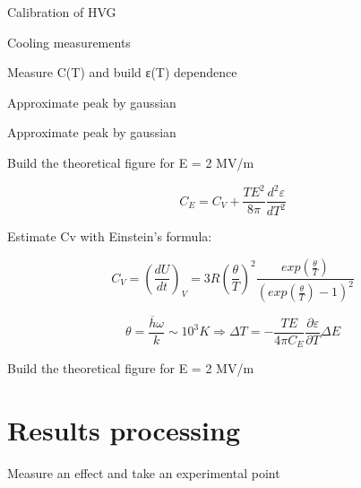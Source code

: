 \documentclass [xcolor=svgnames, t] {beamer}
\begin{document}
\begin{frame}{Calibration of HVG
}
\end{frame}
\begin{frame}{Cooling measurements
}
\end{frame}
\begin{frame}{Measure C(T) and build ε(T) dependence
}
\end{frame}
\begin{frame}{Approximate peak by gaussian
}
\end{frame}
\begin{frame}{Approximate peak by gaussian
}
\end{frame}

\begin{frame}{Build the theoretical figure for E = 2 MV/m
}
\begin{block}{}
 \begin{equation}
     C_{E} = C_{V}+\frac{TE^{2}}{8\pi} \frac{d^{2}\varepsilon }{d T^{2}}
 \end{equation}  
 \end{block}
 Estimate Cv with Einstein’s formula:
 \begin{block}{}
\begin{equation}
   C_{V}=\left(\frac{dU}{dt}\right)_{V} = 3R\left(\frac{\theta}{T}\right)^{2} \frac{exp\left(\frac{\theta}{T}\right)}{\left(exp\left(\frac{\theta}{T}\right)-1\right)^{2}}
\end{equation}
\end{block}
\begin{block}{}
\begin{equation}
    \theta = \frac{\overline{h}\omega}{k}\sim 10^{3} K \Rightarrow \Delta T = -\frac{TE}{4\pi C_E} \frac{\partial \varepsilon}{\partial T} \Delta E
\end{equation}
\end{block}
\end{frame}
\begin{frame}{Build the theoretical figure for E = 2 MV/m
}
\end{frame}
\section{Results processing}
\begin{frame}{Measure an effect and take an experimental point
}
\end{frame}
\end{document}
